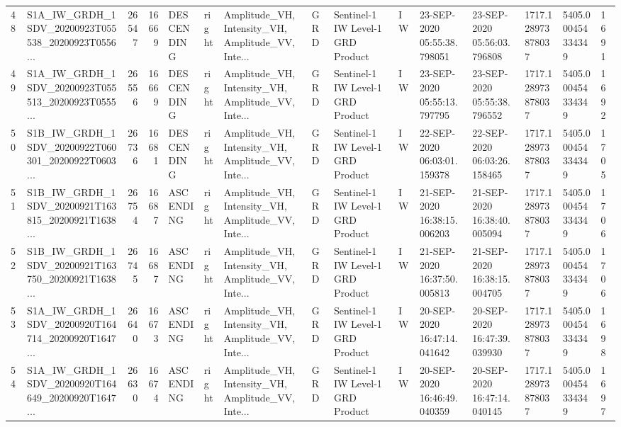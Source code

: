\begin{tabular}{llrrlllllllllll}
48  &  S1A\_IW\_GRDH\_1SDV\_20200923T055538\_20200923T0556... &  26547 &   16669 &  DESCENDING &  right &  Amplitude\_VH, Intensity\_VH, Amplitude\_VV, Inte... &          GRD &  Sentinel-1 IW Level-1 GRD Product &              IW &  23-SEP-2020 05:55:38.798051 &  23-SEP-2020 05:56:03.796808 &          1717.128973878037 &  5405.000454334349 &       1691 \\
49  &  S1A\_IW\_GRDH\_1SDV\_20200923T055513\_20200923T0555... &  26556 &   16669 &  DESCENDING &  right &  Amplitude\_VH, Intensity\_VH, Amplitude\_VV, Inte... &          GRD &  Sentinel-1 IW Level-1 GRD Product &              IW &  23-SEP-2020 05:55:13.797795 &  23-SEP-2020 05:55:38.796552 &          1717.128973878037 &  5405.000454334349 &       1692 \\
50  &  S1B\_IW\_GRDH\_1SDV\_20200922T060301\_20200922T0603... &  26736 &   16681 &  DESCENDING &  right &  Amplitude\_VH, Intensity\_VH, Amplitude\_VV, Inte... &          GRD &  Sentinel-1 IW Level-1 GRD Product &              IW &  22-SEP-2020 06:03:01.159378 &  22-SEP-2020 06:03:26.158465 &          1717.128973878037 &  5405.000454334349 &       1705 \\
51  &  S1B\_IW\_GRDH\_1SDV\_20200921T163815\_20200921T1638... &  26754 &   16687 &   ASCENDING &  right &  Amplitude\_VH, Intensity\_VH, Amplitude\_VV, Inte... &          GRD &  Sentinel-1 IW Level-1 GRD Product &              IW &  21-SEP-2020 16:38:15.006203 &  21-SEP-2020 16:38:40.005094 &          1717.128973878037 &  5405.000454334349 &       1706 \\
52  &  S1B\_IW\_GRDH\_1SDV\_20200921T163750\_20200921T1638... &  26745 &   16687 &   ASCENDING &  right &  Amplitude\_VH, Intensity\_VH, Amplitude\_VV, Inte... &          GRD &  Sentinel-1 IW Level-1 GRD Product &              IW &  21-SEP-2020 16:37:50.005813 &  21-SEP-2020 16:38:15.004705 &          1717.128973878037 &  5405.000454334349 &       1706 \\
53  &  S1A\_IW\_GRDH\_1SDV\_20200920T164714\_20200920T1647... &  26640 &   16673 &   ASCENDING &  right &  Amplitude\_VH, Intensity\_VH, Amplitude\_VV, Inte... &          GRD &  Sentinel-1 IW Level-1 GRD Product &              IW &  20-SEP-2020 16:47:14.041642 &  20-SEP-2020 16:47:39.039930 &          1717.128973878037 &  5405.000454334349 &       1698 \\
54  &  S1A\_IW\_GRDH\_1SDV\_20200920T164649\_20200920T1647... &  26630 &   16674 &   ASCENDING &  right &  Amplitude\_VH, Intensity\_VH, Amplitude\_VV, Inte... &          GRD &  Sentinel-1 IW Level-1 GRD Product &              IW &  20-SEP-2020 16:46:49.040359 &  20-SEP-2020 16:47:14.040145 &          1717.128973878037 &  5405.000454334349 &       1697 \\

\end{tabular}
